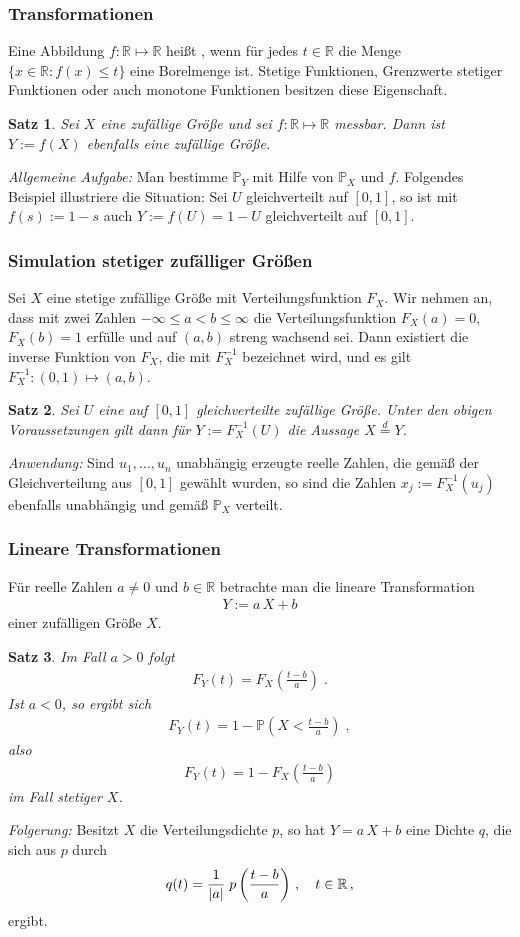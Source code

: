 \documentclass[ngerman,draft,parskip=half,twoside]{scrartcl}
\newtheorem{thm}{Satz}[section]
\DeclarePairedDelimiter{\abs}{\lvert}{\rvert}
\newcommand*{\highl}[2][]{\textbf{\boldmath{#2}}%
  \ifthenelse{\equal{#1}{}}{\index{#2}}{\index{#1}}%
}
\newcommand*{\R}{\mathbb{R}}      %
\newcommand*{\WKM}{\mathbb{P}}      %
\begin{document}
\subsubsection{Transformationen}
Eine Abbildung $f\colon\R\mapsto\R$ heißt \highl{messbar}, wenn für jedes $t\in\R$ die
Menge $\{x\in \R \colon f(x)\le t\}$ eine Borelmenge ist. Stetige Funktionen, Grenzwerte stetiger
Funktionen oder auch monotone Funktionen besitzen diese Eigenschaft.
\begin{thm}
Sei $X$ eine zufällige Größe und sei $f\colon\R\mapsto\R$ messbar. Dann ist $Y:=f(X)$ ebenfalls
eine zufällige Größe.
\end{thm}
\textit{Allgemeine Aufgabe:} Man bestimme $\WKM_Y$ mit Hilfe von $\WKM_X$ und $f$.
Folgendes Beispiel illustriere die Situation: Sei $U$ gleichverteilt auf $[0,1]$, so ist mit
$f(s):=1-s$ auch $Y:=f(U)=1-U$ gleichverteilt auf $[0,1]$.
\subsubsection{Simulation stetiger zufälliger Größen}
Sei $X$ eine stetige zufällige Größe mit Verteilungsfunktion $F_X$. Wir nehmen an,
dass mit zwei Zahlen
$-\infty\le a<b\le\infty$ die Verteilungsfunktion $F_X(a)=0$, $F_X(b)=1$ erfülle  und
auf $(a,b)$ streng wachsend sei. Dann
existiert die inverse Funktion von $F_X$, die mit $F_X^{-1}$ bezeichnet wird, und es
gilt $F_X^{-1}\colon(0,1)\mapsto (a,b)$.
\begin{thm}
Sei $U$ eine auf $[0,1]$ gleichverteilte zufällige Größe. Unter den
obigen Voraussetzungen gilt dann für $Y:=F_X^{-1}(U)$ die Aussage
$X\stackrel{d}{=} Y$.
\end{thm}
\textit{Anwendung:} Sind $u_1,\ldots,u_n$ unabhängig erzeugte reelle Zahlen, die gemäß der
Gleichverteilung aus $[0,1]$ gewählt wurden, so sind die Zahlen $x_j:= F_X^{-1}(u_j)$ ebenfalls unabhängig
und gemäß $\WKM_X$ verteilt.
\subsubsection{Lineare Transformationen}
Für reelle Zahlen $a\not=0$ und $b\in\R$ betrachte man die lineare Transformation
\begin{gather*}
  Y:=a\,X+ b
\end{gather*}
einer zufälligen Größe $X$.
\begin{thm}
Im Fall $a>0$ folgt
  \begin{gather*}
    F_Y(t)=F_X\left(\frac{t-b}{a}\right)\;.
  \end{gather*}
Ist $a<0$, so ergibt sich
  \begin{gather*}
    F_Y(t)=1-\WKM\left(X<\frac{t-b}{a}\right)\;,
  \end{gather*}
also
  \begin{gather*}
    F_Y(t)=1-F_X\left(\frac{t-b}{a}\right)
  \end{gather*}
im Fall stetiger $X$.
\end{thm}
\textit{Folgerung:} Besitzt $X$ die Verteilungsdichte $p$, so hat $Y=a\,X+b$ eine Dichte $q$,
die sich aus $p$ durch
\begin{gather*}
  q(t)=\frac{1}{\abs{a}}\;p\left(\frac{t-b}{a}\right)\,,\quad t\in\R\,,
\end{gather*}
ergibt.
\end{document}
